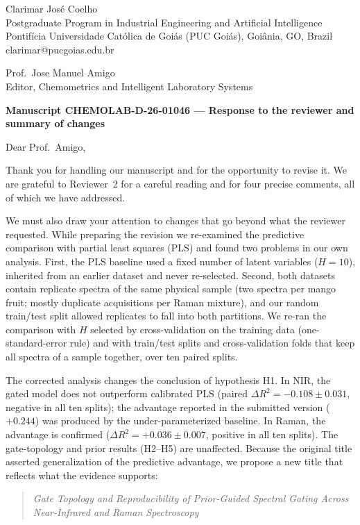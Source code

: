 \documentclass[11pt]{article}
\begin{document}
\noindent Clarimar José Coelho\\
Postgraduate Program in Industrial Engineering and Artificial Intelligence\\
Pontifícia Universidade Católica de Goiás (PUC Goiás), Goiânia, GO, Brazil\\
clarimar@pucgoias.edu.br

\medskip
\noindent Prof.\ Jose Manuel Amigo\\
Editor, Chemometrics and Intelligent Laboratory Systems

\medskip
\noindent\textbf{Manuscript CHEMOLAB-D-26-01046 --- Response to the reviewer and summary of changes}

\medskip
Dear Prof.\ Amigo,

Thank you for handling our manuscript and for the opportunity to revise it. We are grateful to Reviewer~2 for a careful reading and for four precise comments, all of which we have addressed.

We must also draw your attention to changes that go beyond what the reviewer requested. While preparing the revision we re-examined the predictive comparison with partial least squares (PLS) and found two problems in our own analysis. First, the PLS baseline used a fixed number of latent variables ($H=10$), inherited from an earlier dataset and never re-selected. Second, both datasets contain replicate spectra of the same physical sample (two spectra per mango fruit; mostly duplicate acquisitions per Raman mixture), and our random train/test split allowed replicates to fall into both partitions. We re-ran the comparison with $H$ selected by cross-validation on the training data (one-standard-error rule) and with train/test splits and cross-validation folds that keep all spectra of a sample together, over ten paired splits.

The corrected analysis changes the conclusion of hypothesis H1. In NIR, the gated model does not outperform calibrated PLS (paired $\Delta R^{2}=-0.108\pm0.031$, negative in all ten splits); the advantage reported in the submitted version ($+0.244$) was produced by the under-parameterized baseline. In Raman, the advantage is confirmed ($\Delta R^{2}=+0.036\pm0.007$, positive in all ten splits). The gate-topology and prior results (H2--H5) are unaffected. Because the original title asserted generalization of the predictive advantage, we propose a new title that reflects what the evidence supports:

\begin{quote}
\emph{Gate Topology and Reproducibility of Prior-Guided Spectral Gating Across Near-Infrared and Raman Spectroscopy}
\end{quote}
\end{document}
